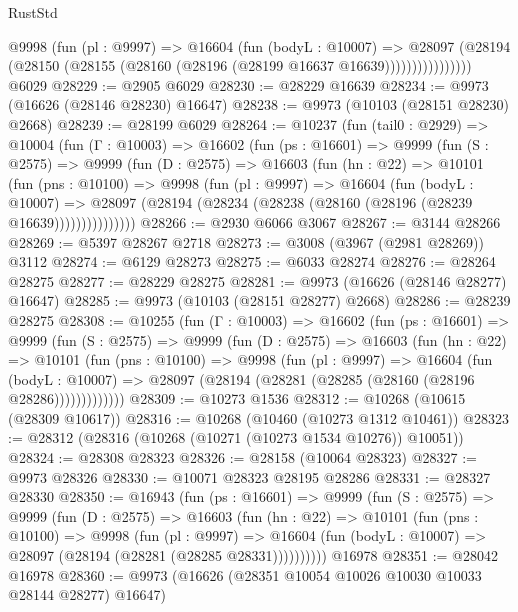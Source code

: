 \begin{lexlean}{RustStd}
\begin{coremodule}
                  @9998
                    (fun (pl : @9997) =>
                    @16604
                      (fun (bodyL : @10007) =>
                      @28097
                        (@28194
                          (@28150 (@28155 (@28160 (@28196 (@28199 @16637 @16639))))))))))))))))
    @6029
@28229 := @2905 @6029
@28230 := @28229 @16639
@28234 := @9973 (@16626 (@28146 @28230) @16647)
@28238 := @9973 (@10103 (@28151 @28230) @2668)
@28239 := @28199 @6029
@28264 := @10237
    (fun (tail0 : @2929) =>
    @10004
      (fun (Γ : @10003) =>
      @16602
        (fun (ps : @16601) =>
        @9999
          (fun (S : @2575) =>
          @9999
            (fun (D : @2575) =>
            @16603
              (fun (hn : @22) =>
              @10101
                (fun (pns : @10100) =>
                @9998
                  (fun (pl : @9997) =>
                  @16604
                    (fun (bodyL : @10007) =>
                    @28097 (@28194 (@28234 (@28238 (@28160 (@28196 (@28239 @16639)))))))))))))))
@28266 := @2930 @6066 @3067
@28267 := @3144 @28266
@28269 := @5397 @28267 @2718
@28273 := @3008 (@3967 (@2981 @28269)) @3112
@28274 := @6129 @28273
@28275 := @6033 @28274
@28276 := @28264 @28275
@28277 := @28229 @28275
@28281 := @9973 (@16626 (@28146 @28277) @16647)
@28285 := @9973 (@10103 (@28151 @28277) @2668)
@28286 := @28239 @28275
@28308 := @10255
    (fun (Γ : @10003) =>
    @16602
      (fun (ps : @16601) =>
      @9999
        (fun (S : @2575) =>
        @9999
          (fun (D : @2575) =>
          @16603
            (fun (hn : @22) =>
            @10101
              (fun (pns : @10100) =>
              @9998
                (fun (pl : @9997) =>
                @16604
                  (fun (bodyL : @10007) =>
                  @28097 (@28194 (@28281 (@28285 (@28160 (@28196 @28286)))))))))))))
@28309 := @10273 @1536
@28312 := @10268 (@10615 (@28309 @10617))
@28316 := @10268 (@10460 (@10273 @1312 @10461))
@28323 := @28312 (@28316 (@10268 (@10271 (@10273 @1534 @10276)) @10051))
@28324 := @28308 @28323
@28326 := @28158 (@10064 @28323)
@28327 := @9973 @28326
@28330 := @10071 @28323 @28195 @28286
@28331 := @28327 @28330
@28350 := @16943
    (fun (ps : @16601) =>
    @9999
      (fun (S : @2575) =>
      @9999
        (fun (D : @2575) =>
        @16603
          (fun (hn : @22) =>
          @10101
            (fun (pns : @10100) =>
            @9998
              (fun (pl : @9997) =>
              @16604 (fun (bodyL : @10007) => @28097 (@28194 (@28281 (@28285 @28331))))))))))
    @16978
@28351 := @28042 @16978
@28360 := @9973 (@16626 (@28351 @10054 @10026 @10030 @10033 @28144 @28277) @16647)

\end{coremodule}
\end{lexlean}
